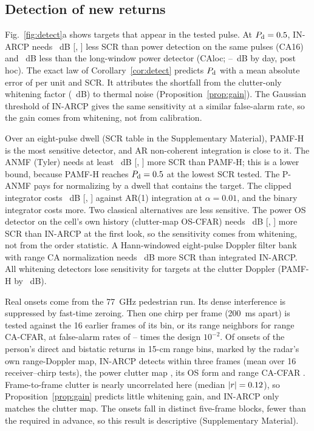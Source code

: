 \documentclass[journal]{IEEEtran}
\begin{document}
\subsection{Detection of new returns}\label{sec:detect}
Fig.~\ref{fig:detect}a shows targets that appear in the tested pulse. At $P_{\rm d}=0.5$, IN-ARCP needs \DetINGainCAHalf~dB [\DetINGainCALoHalf, \DetINGainCAHiHalf] less SCR than power detection on the same pulses (CA16) and \DetINGainLocHalf~dB less than the long-window power detector (CAloc; \DayGainMin--\DayGainMax~dB by day, post hoc). The exact law of Corollary~\ref{cor:detect} predicts $P_{\rm d}$ with a mean absolute error of \DetMae{} per unit and SCR. It attributes the shortfall from the clutter-only whitening factor (\DetNaiveGain~dB) to thermal noise (Proposition~\ref{prop:gain}). The Gaussian threshold of IN-ARCP gives the same sensitivity at a similar false-alarm rate, so the gain comes from whitening, not from calibration.

Over an eight-pulse dwell (SCR table in the Supplementary Material), PAMF-H is the most sensitive detector, and AR non-coherent integration is close to it. The ANMF (Tyler) needs at least \AFpMinusPamf~dB [\AFpMinusPamfLo, \AFpMinusPamfHi] more SCR than PAMF-H; this is a lower bound, because PAMF-H reaches $P_{\rm d}=0.5$ at the lowest SCR tested. The P-ANMF pays for normalizing by a dwell that contains the target. The clipped integrator costs \AClipMinusDin~dB [\AClipMinusDinLo, \AClipMinusDinHi] against AR(1) integration at $\alpha=0.01$, and the binary integrator costs more. Two classical alternatives are less sensitive. The power OS detector on the cell's own history (clutter-map OS-CFAR) needs \AOsrawMinusIn~dB [\AOsrawMinusInLo, \AOsrawMinusInHi] more SCR than IN-ARCP at the first look, so the sensitivity comes from whitening, not from the order statistic. A Hann-windowed eight-pulse Doppler filter bank with range CA normalization needs \ClINvsMTD~dB more SCR than integrated IN-ARCP. All whitening detectors lose sensitivity for targets at the clutter Doppler (PAMF-H by \ClPAMFMatched~dB).

Real onsets come from the 77~GHz pedestrian run. Its dense interference is suppressed by fast-time zeroing. Then one chirp per frame (200~ms apart) is tested against the 16 earlier frames of its bin, or its range neighbors for range CA-CFAR, at false-alarm rates of \PedPfaMin--\PedPfaMax{} times the design $10^{-2}$. Of \PedEvents{} onsets of the person's direct and bistatic returns in 15-cm range bins, marked by the radar's own range-Doppler map, IN-ARCP detects \PedIN{} within three frames (mean over 16 receiver--chirp tests), the power clutter map \PedCA, its OS form \PedOS{} and range CA-CFAR \PedRCA. Frame-to-frame clutter is nearly uncorrelated here (median $|r|=0.12$), so Proposition~\ref{prop:gain} predicts little whitening gain, and IN-ARCP only matches the clutter map. The onsets fall in \PedBlocks{} distinct five-frame blocks, fewer than the \PedBlocksReq{} required in advance, so this result is descriptive (Supplementary Material).
\end{document}
